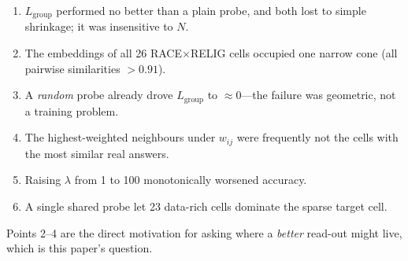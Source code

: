 \begin{enumerate}
  \item $L_{\text{group}}$ performed no better than a plain probe, and
        both lost to simple shrinkage; it was insensitive to $N$.
  \item The embeddings of all 26 RACE$\times$RELIG cells occupied one
        narrow cone (all pairwise similarities $>0.91$).
  \item A \emph{random} probe already drove $L_{\text{group}}$ to
        $\approx0$---the failure was geometric, not a training problem.
  \item The highest-weighted neighbours under $w_{ij}$ were frequently
        not the cells with the most similar real answers.
  \item Raising $\lambda$ from 1 to 100 monotonically worsened accuracy.
  \item A single shared probe let 23 data-rich cells dominate the sparse
        target cell.
\end{enumerate}

Points 2--4 are the direct motivation for asking where a \emph{better}
read-out might live, which is this paper's question.
